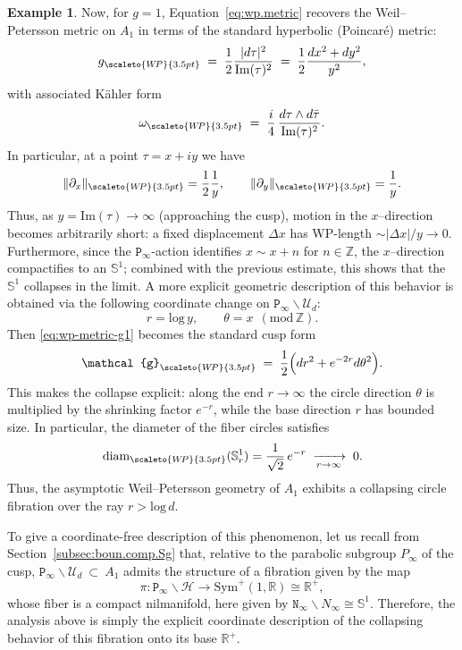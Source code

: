 \documentclass[11pt]{amsart}
\theoremstyle{plain}
\theoremstyle{definition}
\newtheorem{example}[theorem]{Example}
\theoremstyle{remark}
\newcommand{\R}{\mathbb R}
\newcommand{\Z}{\mathbb{Z}}
\renewcommand{\log}{\mathrm{log}}
\newcommand{\im}{\mathrm{Im}}
\newcommand{\g}{\mathcal{g}}
\newcommand{\sym}{\mathrm{Sym}^{\!+}}
\newcommand{\cH}{\mathcal{H}}
\newcommand{\tP}{\mathtt{P}}
\newcommand{\tN}{\mathtt{N}}
\begin{document}
\begin{example}
    Now, for $g=1$, Equation~\eqref{eq:wp.metric} recovers the Weil--Petersson metric on $A_1$ in terms of the standard hyperbolic (Poincar\'e) metric:
    \begin{equation}\label{eq:wp-metric-g1}
      g_{\scaleto{W\!P}{3.5pt}}
      \;=\;
      \frac{1}{2}\frac{|d\tau|^2}{\im(\tau)^2}
      \;=\;
      \frac{1}{2}\frac{dx^2+dy^2}{y^2},
    \end{equation}
    with associated K\"ahler form
    \[
      \omega_{\scaleto{W\!P}{3.5pt}} \;=\; \frac{i}{4}\,\frac{d\tau\wedge d\bar\tau}{\im(\tau)^2}.
    \]
    In particular, at a point $\tau=x+iy$ we have
    \[
      \|\partial_x\|_{\scaleto{W\!P}{3.5pt}}=\frac{1}{2}\frac{1}{y},
      \qquad
      \|\partial_y\|_{\scaleto{W\!P}{3.5pt}}=\frac{1}{y}.
    \]
    Thus, as $y=\im(\tau)\to\infty$ (approaching the cusp), motion in the $x$--direction becomes arbitrarily short: a fixed displacement $\Delta x$ has WP-length $\sim |\Delta x|/y\to 0$. Furthermore, since the $\tP_\infty$-action identifies $x\sim x+n$ for $n\in\Z$, the $x$--direction compactifies to an $\mathbb{S}^1$; combined with the previous estimate, this shows that the $\mathbb{S}^1$ collapses in the limit. A more explicit geometric description of this behavior is obtained via the following coordinate change on $\tP_\infty\backslash\mathcal{U}_d$:
    \[
    r=\log \,y,\qquad \theta=x \:\:(\mathrm{mod}\,\Z).
    \]
    Then \eqref{eq:wp-metric-g1} becomes the standard cusp form
    \begin{equation}\label{eq:wp-cusp-form-g1}
      \g_{\scaleto{W\!P}{3.5pt}}
      \;=\;
      \frac{1}{2}\Big(dr^2 + e^{-2r}d\theta^2\Big).
    \end{equation}
    This makes the collapse explicit: along the end $r\to\infty$ the circle direction $\theta$ is multiplied by the shrinking factor $e^{-r}$, while the base direction $r$ has bounded size. In particular, the diameter of the fiber circles satisfies
    \[
      \mathrm{diam}_{\scaleto{W\!P}{3.5pt}}(\mathbb{S}^1_r)
      =
      \frac{1}{\sqrt{2}}\,e^{-r}
      \;\xrightarrow[r\to\infty]{}\;0.
    \]
    Thus, the asymptotic Weil--Petersson geometry of $A_1$ exhibits a collapsing circle fibration over the ray $r>\log \,d$.

    To give a coordinate-free description of this phenomenon, let us recall from Section~\ref{subsec:boun.comp.Sg} that, relative to the parabolic subgroup $P_\infty$ of the cusp, $\tP_\infty\backslash\mathcal{U}_d~\subset~A_1$ admits the structure of a fibration given by the map
    \begin{equation}
        \pi:\tP_\infty\backslash\cH \to \sym(1,\R)\cong\R^{+},
    \end{equation}
    whose fiber is a compact nilmanifold, here given by $\tN_\infty\backslash N_\infty \cong \mathbb{S}^{1}$. Therefore, the analysis above is simply the explicit coordinate description of the collapsing behavior of this fibration onto its base $\R^+$.
\end{example}
\end{document}
